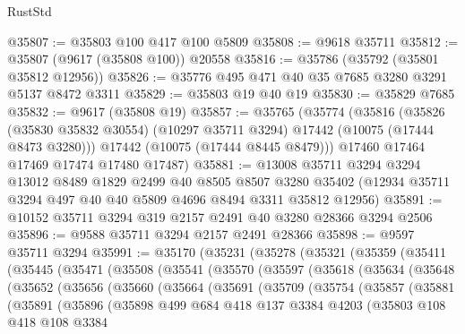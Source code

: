 \begin{lexlean}{RustStd}
\begin{coremodule}
@35807 := @35803 @100 @417 @100 @5809
@35808 := @9618 @35711
@35812 := @35807 (@9617 (@35808 @100)) @20558
@35816 := @35786 (@35792 (@35801 @35812 @12956))
@35826 := @35776 @495 @471 @40 @35 @7685 @3280 @3291 @5137 @8472 @3311
@35829 := @35803 @19 @40 @19
@35830 := @35829 @7685
@35832 := @9617 (@35808 @19)
@35857 := @35765
    (@35774
      (@35816
        (@35826 (@35830 @35832 @30554) (@10297 @35711 @3294) @17442 (@10075 (@17444 @8473 @3280)))
        @17442
        (@10075 (@17444 @8445 @8479)))
      @17460
      @17464
      @17469
      @17474
      @17480
      @17487)
@35881 := @13008
    @35711
    @3294
    @3294
    @13012
    @8489
    @1829
    @2499
    @40
    @8505
    @8507
    @3280
    @35402
    (@12934 @35711 @3294 @497 @40 @40 @5809 @4696 @8494 @3311 @35812 @12956)
@35891 := @10152 @35711 @3294 @319 @2157 @2491 @40 @3280 @28366 @3294 @2506
@35896 := @9588 @35711 @3294 @2157 @2491 @28366
@35898 := @9597 @35711 @3294
@35991 := @35170
    (@35231
      (@35278
        (@35321
          (@35359
            (@35411
              (@35445
                (@35471
                  (@35508
                    (@35541
                      (@35570
                        (@35597
                          (@35618
                            (@35634
                              (@35648
                                (@35652
                                  (@35656
                                    (@35660
                                      (@35664
                                        (@35691
                                          (@35709
                                            (@35754
                                              (@35857
                                                (@35881
                                                  (@35891
                                                    (@35896
                                                      (@35898
                                                        @499
                                                        @684
                                                        @418
                                                        @137
                                                        @3384
                                                        @4203
                                                        (@35803
                                                          @108
                                                          @418
                                                          @108
                                                          @3384

\end{coremodule}
\end{lexlean}
